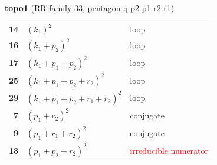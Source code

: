 \documentclass[10pt]{article}
\begin{document}
\begin{minipage}[t]{0.48\textwidth}
{}\\[2mm]\textbf{topo1} (RR family 33, pentagon q-p2-p1-r2-r1)\\[2pt]{\footnotesize\begin{tabular}{@{}r@{\ \ }l@{\ \ }l@{}}\textbf{14} & $(k_1)^2$ & loop\\
\textbf{16} & $(k_1+p_2)^2$ & loop\\
\textbf{17} & $(k_1+p_1+p_2)^2$ & loop\\
\textbf{25} & $(k_1+p_1+p_2+r_2)^2$ & loop\\
\textbf{29} & $(k_1+p_1+p_2+r_1+r_2)^2$ & loop\\
\textbf{7} & $(p_1+r_2)^2$ & conjugate\\
\textbf{9} & $(p_1+r_1+r_2)^2$ & conjugate\\
\textbf{13} & $(p_1+p_2+r_2)^2$ & \textcolor{red}{irreducible numerator}\\\end{tabular}}\end{minipage}\hfill%
\end{document}
